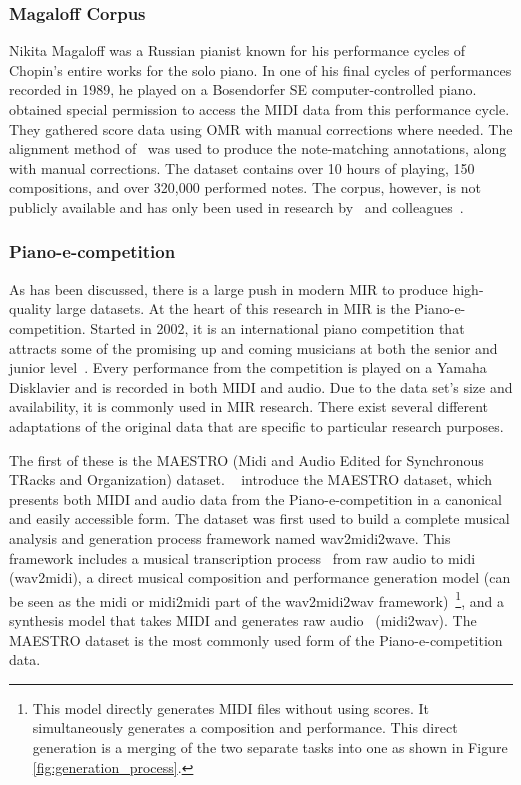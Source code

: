 \subsubsection{Magaloff Corpus}
Nikita Magaloff was a Russian pianist known for his performance cycles of Chopin's entire works for the solo piano. In one of his final cycles of performances recorded in 1989, he played on a Bosendorfer SE computer-controlled piano.~\citet{flossmann2010magaloff} obtained special permission to access the MIDI data from this performance cycle. They gathered score data using OMR with manual corrections where needed.  The alignment method of~\citet{grachten2006expressivity} was used to produce the note-matching annotations, along with manual corrections. The dataset contains over 10 hours of playing, 150 compositions, and over 320,000 performed notes. The corpus, however, is not publicly available and has only been used in research by~\citet{flossmann2010magaloff} and colleagues~\cite{eduardo2018computational}. 

\subsubsection{Piano-e-competition}
As has been discussed, there is a large push in modern MIR to produce high-quality large datasets. At the heart of this research in MIR is the Piano-e-competition. Started in 2002, it is an international piano competition that attracts some of the promising up and coming musicians at both the senior and junior level~\cite{the-disklavier-education-network}. Every performance from the competition is played on a Yamaha Disklavier and is recorded in both MIDI and audio. Due to the data set's size and availability, it is commonly used in MIR research. There exist several different adaptations of the original data that are specific to particular research purposes. 

The first of these is the MAESTRO (Midi and Audio Edited for Synchronous TRacks and Organization) dataset. ~\citet{hawthorne2018enabling} introduce the MAESTRO dataset, which presents both MIDI and audio data from the Piano-e-competition in a canonical and easily accessible form. The dataset was first used to build a complete musical analysis and generation process framework named wav2midi2wave. This framework includes a musical transcription process~\cite{hawthorne2017onsets} from raw audio to midi (wav2midi), a direct musical composition and performance generation model (can be seen as the midi or midi2midi part of the wav2midi2wav framework)~\cite{huang2018music}\footnote{This model directly generates MIDI files without using scores. It simultaneously generates a composition and performance. This direct generation is a merging of the two separate tasks into one as shown in Figure \ref{fig:generation_process}.}, and a synthesis model that takes MIDI and generates raw audio~\cite{oord2016wavenet} (midi2wav). The MAESTRO dataset is the most commonly used form of the Piano-e-competition data. 

